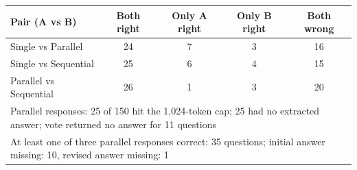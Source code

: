 \begin{tabular}{lcccc}
\toprule
Pair (A vs B) & Both right & Only A right & Only B right & Both wrong \\
\midrule
Single vs Parallel & 24 & 7 & 3 & 16 \\
Single vs Sequential & 25 & 6 & 4 & 15 \\
Parallel vs Sequential & 26 & 1 & 3 & 20 \\ \midrule
\multicolumn{5}{p{0.9\linewidth}}{Parallel responses: 25 of 150 hit the 1,024-token cap; 25 had no extracted answer; vote returned no answer for 11 questions} \\
\multicolumn{5}{p{0.9\linewidth}}{At least one of three parallel responses correct: 35 questions; initial answer missing: 10, revised answer missing: 1} \\
\bottomrule
\end{tabular}